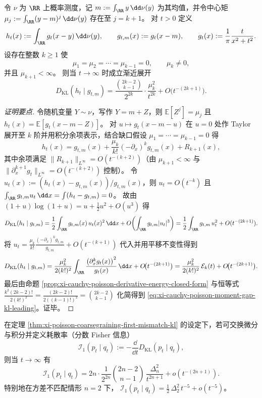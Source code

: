 \begin{theorem}\label{thm:xi-cauchy-poisson-moment-gap-kl-leading}
令 \(\nu\) 为 \(\RR\) 上概率测度，记
\(
m:=\int_{\RR}y\,\dd\nu(y)
\)
为其均值，并令中心矩
\(
\mu_j:=\int_{\RR}(y-m)^j\,\dd\nu(y)
\)
存在至 \(j=k+1\)。
对 \(t>0\) 定义
\[
h_t(x):=\int_{\RR} g_t(x-y)\,\dd\nu(y),
\qquad
g_{t,m}(x):=g_t(x-m),
\qquad
g_t(x):=\frac{1}{\pi}\frac{t}{x^2+t^2}.
\]
设存在整数 \(k\ge 1\) 使
\[
\mu_1=\mu_2=\cdots=\mu_{k-1}=0,
\qquad
\mu_k\neq 0,
\]
并且 \(\mu_{k+1}<\infty\)。
则当 \(t\to\infty\) 时成立渐近展开
\begin{equation}\label{eq:xi-cauchy-poisson-moment-gap-kl-leading}
\boxed{\;
D_{\mathrm{KL}}(h_t\mid g_{t,m})
=\frac{\binom{2k-2}{k-1}}{2^{2k}}\cdot\frac{\mu_k^2}{t^{2k}}
+O\!\bigl(t^{-(2k+1)}\bigr).\;}
\end{equation}
\end{theorem}

\begin{proof}[证明要点]
令随机变量 \(Y\sim\nu\)，写作 \(Y=m+Z\)，则 \(\mathbb E[Z^j]=\mu_j\) 且
\(
h_t(x)=\mathbb E[g_t(x-m-Z)]
\)。
对 \(u\mapsto g_t(x-m-u)\) 在 \(u=0\) 处作 Taylor 展开至 \(k\) 阶并用积分余项表示，结合缺口假设 \(\mu_1=\cdots=\mu_{k-1}=0\) 得
\[
h_t(x)=g_{t,m}(x)+\frac{\mu_k}{k!}(-\partial_x)^k g_{t,m}(x)+R_{k+1}(x),
\]
其中余项满足 \(\|R_{k+1}\|_{L^\infty}=O(t^{-(k+2)})\)（由 \(\mu_{k+1}<\infty\) 与 \(\|\partial_x^{k+1}g_t\|_{L^\infty}=O(t^{-(k+2)})\) 控制）。
令 \(u_t(x):=(h_t(x)-g_{t,m}(x))/g_{t,m}(x)\)，则 \(u_t=O(t^{-k})\) 且 \(\int_{\RR}g_{t,m}u_t\,\dd x=\int(h_t-g_{t,m})=0\)。
故由 \((1+u)\log(1+u)=u+\tfrac12u^2+O(u^3)\) 得
\[
D_{\mathrm{KL}}(h_t\mid g_{t,m})
=\frac12\int_{\RR} g_{t,m}(x)\,u_t(x)^2\,\dd x+O\!\left(\int_{\RR} g_{t,m}|u_t|^3\right)
=\frac12\int_{\RR} g_{t,m}\,u_t^2+O(t^{-(2k+1)}).
\]
将
\(
u_t=\frac{\mu_k}{k!}\frac{(-\partial_x)^k g_{t,m}}{g_{t,m}}+O(t^{-(k+1)})
\)
代入并用平移不变性得到
\[
D_{\mathrm{KL}}(h_t\mid g_{t,m})
=\frac{\mu_k^2}{2(k!)^2}\int_{\RR}\frac{\bigl(\partial_x^{k} g_t(x)\bigr)^2}{g_t(x)}\,\dd x
+O\!\bigl(t^{-(2k+1)}\bigr)
=\frac{\mu_k^2}{2(k!)^2}\,\mathcal{E}_k(t)+O\!\bigl(t^{-(2k+1)}\bigr).
\]
最后由命题 \ref{prop:xi-cauchy-poisson-derivative-energy-closed-form} 与恒等式
\(
\frac{k^2(2k-2)!}{2(k!)^2}
=\frac{(2k-2)!}{2((k-1)!)^2}
=\binom{2k-2}{k-1}
\)
化简得到 \eqref{eq:xi-cauchy-poisson-moment-gap-kl-leading}。证毕。
\end{proof}

\begin{corollary}\label{cor:xi-poisson-first-mismatch-dissipation-leading}
在定理 \ref{thm:xi-poisson-coarsegraining-first-mismatch-kl} 的设定下，若可交换微分与积分并定义耗散率（分数 Fisher 信息）
\[
\mathcal I_1(p_t\mid q_t):=-\frac{\dd}{\dd t}D_{\mathrm{KL}}(p_t\mid q_t),
\]
则当 \(t\to\infty\) 有
\[
\mathcal I_1(p_t\mid q_t)
=2n\cdot\frac{1}{2^{2n}}\binom{2n-2}{n-1}\,\frac{\Delta_n^2}{t^{2n+1}}+o(t^{-(2n+1)}).
\]
特别地在方差不匹配情形 \(n=2\) 下，
\(
\mathcal I_1(p_t\mid q_t)=\frac12\,\Delta_2^2\,t^{-5}+o(t^{-5})
\)。
\end{corollary}

